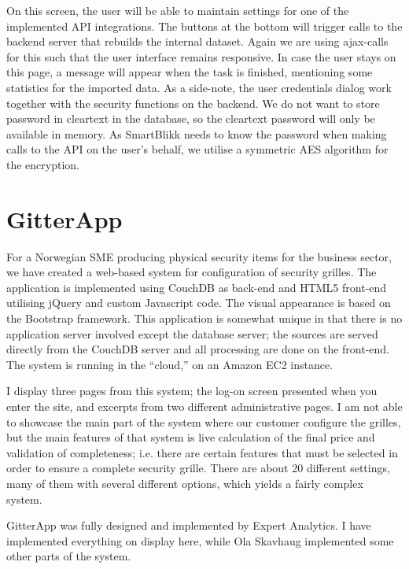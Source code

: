 \documentclass[11pt]{article}
\begin{document}
\vspace{\baselineskip}
\noindent
On this screen, the user will be able to maintain settings for one of the implemented API integrations. The buttons at the bottom will trigger calls to the backend server that rebuilds the internal dataset. Again we are using ajax-calls for this such that the user interface remains responsive. In case the user stays on this page, a message will appear when the task is finished, mentioning some statistics for the imported data. As a side-note, the user credentials dialog work together with the security functions on the backend. We do not want to store password in cleartext in the database, so the cleartext password will only be available in memory. As SmartBlikk needs to know the password when making calls to the API on the user's behalf, we utilise a symmetric AES algorithm for the encryption.  

\section*{GitterApp}
For a Norwegian SME producing physical security items for the business sector, we have created a web-based system for configuration of security grilles. The application is implemented using CouchDB as back-end and HTML5 front-end utilising jQuery and custom Javascript code. The visual appearance is based on the Bootstrap framework. This application is somewhat unique in that there is no application server involved except the database server; the sources are served directly from the CouchDB server and all processing are done on the front-end. The system is running in the ``cloud,'' on an Amazon EC2 instance. 

I display three pages from this system; the log-on screen presented when you enter the site, and excerpts from two different administrative pages. I am not able to showcase the main part of the system where our customer configure the grilles, but the main features of that system is live calculation of the final price and validation of completeness; i.e. there are certain features that must be selected in order to ensure a complete security grille. There are about 20 different settings, many of them with several different options, which yields a fairly complex system. 

GitterApp was fully designed and implemented by Expert Analytics. I have implemented everything on display here, while Ola Skavhaug implemented some other parts of the system.
\end{document}
